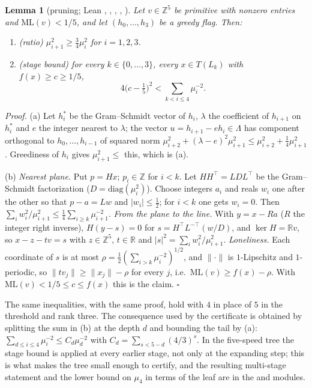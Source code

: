 \documentclass[11pt]{article}
\newtheorem{lemma}[theorem]{Lemma}
\theoremstyle{remark}
\newcommand{\ML}{\mathrm{ML}}
\newcommand{\R}{\mathbb{R}}
\newcommand{\Z}{\mathbb{Z}}
\newcommand{\dist}[1]{\lVert #1\rVert}
\begin{document}
\begin{lemma}[pruning; Lean , , , , ]\label{lem:prune}
Let $v\in\Z^5$ be primitive with nonzero entries and $\ML(v)<1/5$, and let $(h_0,\dots,h_3)$ be a greedy flag. Then:
\begin{enumerate}
\item[(a)] (ratio) $\mu_{i+1}^2\ge\tfrac34\mu_i^2$ for $i=1,2,3$.
\item[(b)] (stage bound) for every $k\in\{0,\dots,3\}$, every $x\in T(L_k)$ with $f(x)\ge c\ge1/5$,
\[
4\bigl(c-\tfrac15\bigr)^2<\sum_{k<i\le4}\mu_i^{-2}.
\]
\end{enumerate}
\end{lemma}
\emph{Proof.} (a) Let $h^*_i$ be the Gram--Schmidt vector of $h_i$, $\lambda$ the coefficient of $h_{i+1}$ on $h^*_i$ and $e$ the integer nearest to $\lambda$; the vector $u=h_{i+1}-eh_i\in\Lambda$ has component orthogonal to $h_0,\dots,h_{i-1}$ of squared norm $\mu_{i+2}^2+(\lambda-e)^2\mu_{i+1}^2\le\mu_{i+2}^2+\tfrac14\mu_{i+1}^2$. Greediness of $h_i$ gives $\mu_{i+1}^2\le$ this, which is (a).

(b) \emph{Nearest plane.} Put $p=Hx$; $p_i\in\Z$ for $i<k$. Let $H H^{\top}=LDL^{\top}$ be the Gram--Schmidt factorization ($D=\mathrm{diag}(\mu_i^2)$). Choose integers $a_i$ and reals $w_i$ one after the other so that $p-a=Lw$ and $|w_i|\le\tfrac12$; for $i<k$ one gets $w_i=0$. Then $\sum_iw_i^2/\mu_{i+1}^2\le\tfrac14\sum_{i\ge k}\mu_{i+1}^{-2}$. \emph{From the plane to the line.} With $y=x-Ra$ ($R$ the integer right inverse), $H(y-s)=0$ for $s=H^{\top}L^{-\top}(w/D)$, and $\ker H=\R v$, so $x-z-tv=s$ with $z\in\Z^5$, $t\in\R$ and $|s|^2=\sum_iw_i^2/\mu_{i+1}^2$. \emph{Loneliness.} Each coordinate of $s$ is at most $\rho=\tfrac12(\sum_{i>k}\mu_i^{-2})^{1/2}$, and $\dist{\cdot}$ is $1$-Lipschitz and $1$-periodic, so $\dist{tv_j}\ge\dist{x_j}-\rho$ for every $j$, i.e.\ $\ML(v)\ge f(x)-\rho$. With $\ML(v)<1/5\le c\le f(x)$ this is the claim. $\square$

The same inequalities, with the same proof, hold with $4$ in place of $5$ in the threshold and rank three. The consequence used by the certificate is obtained by splitting the sum in (b) at the depth $d$ and bounding the tail by (a): $\sum_{d\le i\le4}\mu_i^{-2}\le C_d\mu_d^{-2}$ with $C_d=\sum_{s<5-d}(4/3)^s$. In the five-speed tree the stage bound is applied at every earlier stage, not only at the expanding step; this is what makes the tree small enough to certify, and the resulting multi-stage statement and the lower bound on $\mu_4$ in terms of the leaf are in the  and  modules.
\end{document}
